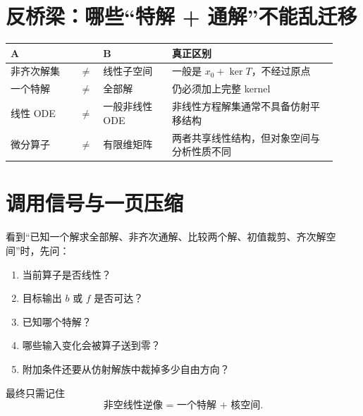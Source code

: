 \documentclass[profile=standard]{ipara-handbook}
\begin{document}
\section{反桥梁：哪些“特解 + 通解”不能乱迁移}
\begin{tabular}{p{0.20\linewidth}p{0.04\linewidth}p{0.20\linewidth}p{0.48\linewidth}}
\hline
A & & B & 真正区别\\
\hline
非齐次解集 & $\neq$ & 线性子空间 & 一般是 $x_0+\ker T$，不经过原点\\
一个特解 & $\neq$ & 全部解 & 仍必须加上完整 kernel\\
线性 ODE & $\neq$ & 一般非线性 ODE & 非线性方程解集通常不具备仿射平移结构\\
微分算子 & $\neq$ & 有限维矩阵 & 两者共享线性结构，但对象空间与分析性质不同\\
\hline
\end{tabular}

\section{调用信号与一页压缩}
看到“已知一个解求全部解、非齐次通解、比较两个解、初值裁剪、齐次解空间”时，先问：
\begin{enumerate}
\item 当前算子是否线性？
\item 目标输出 $b$ 或 $f$ 是否可达？
\item 已知哪个特解？
\item 哪些输入变化会被算子送到零？
\item 附加条件还要从仿射解族中裁掉多少自由方向？
\end{enumerate}

最终只需记住
\[
\boxed{\text{非空线性逆像 = 一个特解 + 核空间}.}
\]
\end{document}
